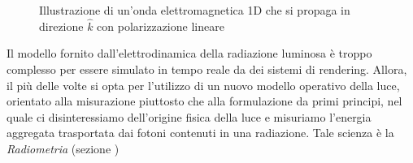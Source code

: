 \begin{figure}[t]
	\caption{Illustrazione di un'onda elettromagnetica 1D che si propaga in direzione $\hat{k}$ con polarizzazione lineare}
	\label{chapter1:EMwave}
\end{figure}
Il modello fornito dall'elettrodinamica della radiazione luminosa \`e troppo complesso per essere simulato in tempo reale da dei sistemi di rendering.
Allora, il pi\`u delle volte si opta per l'utilizzo di un nuovo modello operativo della luce, orientato 
alla misurazione piuttosto che alla formulazione da primi principi, nel quale ci disinteressiamo dell'origine fisica della luce e misuriamo
l'energia aggregata trasportata dai fotoni contenuti in una radiazione. Tale scienza \`e la \textit{Radiometria} (sezione )\par
